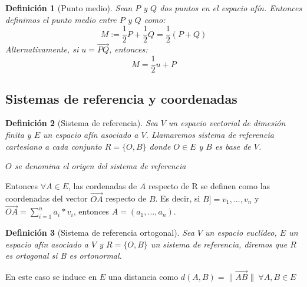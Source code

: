 \documentclass[11pt, a4paper]{article}
\newif\IfInSansMode
\renewcommand{\vec}{\overrightarrow}
\theoremstyle{theorem-style}
\newtheorem{nth}{Teorema}[section]
\theoremstyle{definition-style}
\newtheorem{ndef}{Definición}[section]
\theoremstyle{remark-style}
\theoremstyle{example-style}
\begin{document}
\begin{ndef}[Punto medio]
  Sean $P$ y $Q$ dos puntos en el espacio afín. Entonces definimos el punto medio entre $P$ y $Q$ como:
  \[
    M := \dfrac{1}{2} P + \dfrac{1}{2}Q = \dfrac{1}{2}(P+Q)
  \]
  Alternativamente, si $u = \overrightarrow{PQ}$, entonces:
  \[
    M = \dfrac{1}{2}u + P
  \]

\end{ndef}

\subsection{Sistemas de referencia y coordenadas}

\begin{ndef}[Sistema de referencia]
Sea $V$ un espacio vectorial de dimesión finita y $E$ un espacio afín asociado a $V$. Llamaremos \textit{ sistema de referencia cartesiano } a cada conjunto $R=\{O,B\}$ donde $O\in E$ y $B$ es base de $V$.

$O$ se denomina el origen del sistema de referencia 

\end{ndef}

Entonces $\forall A \in E$, las cordenadas de $A$ respecto de R se definen como las coordenadas del vector $\vec{OA}$ respecto de $B$. Es decir, si $B] = v_1, ... ,v_n $ y $\vec{OA} = \sum_{i=1}^{n} a_i*v_i$, entonces $A = (a_1,..., a_n)$.

\begin{ndef}[Sistema de referencia ortogonal]
Sea $V$ un espacio euclídeo, $E$ un espacio afín asociado a $V$ y $R=\{O,B\}$ un sistema de referencia, diremos que $R$ es ortogonal si B es ortonormal.

\end{ndef}

En este caso se induce en $E$ una distancia como $d(A,B) = \|\vec{AB}\|\ \forall A,B \in E$ 



\end{document}
